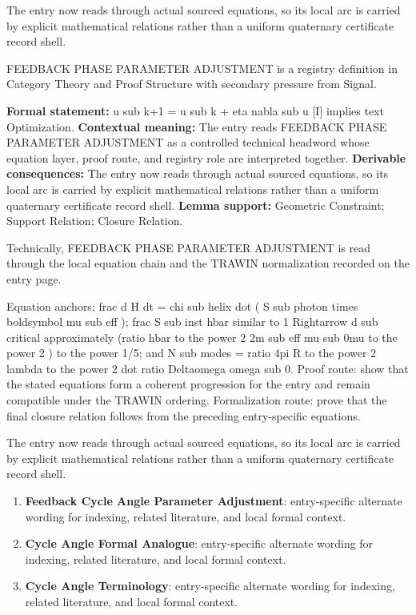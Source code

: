 The entry now reads through actual sourced equations, so its local arc is carried by explicit mathematical relations rather than a uniform quaternary certificate record shell.
\clearpage


\begingroup\small
{}
FEEDBACK PHASE PARAMETER ADJUSTMENT is a registry definition in Category Theory and Proof Structure with secondary pressure from Signal.

\begingroup\footnotesize\setlength{\emergencystretch}{3em}\sloppy
\textbf{Formal statement:} u sub k+1 = u sub k + eta nabla sub u [I] implies text Optimization. \textbf{Contextual meaning:} The entry reads FEEDBACK PHASE PARAMETER ADJUSTMENT as a controlled technical headword whose equation layer, proof route, and registry role are interpreted together. \textbf{Derivable consequences:} The entry now reads through actual sourced equations, so its local arc is carried by explicit mathematical relations rather than a uniform quaternary certificate record shell. \textbf{Lemma support:} Geometric Constraint; Support Relation; Closure Relation.\par
\endgroup

Technically, FEEDBACK PHASE PARAMETER ADJUSTMENT is read through the local equation chain and the TRAWIN normalization recorded on the entry page.

Equation anchors: frac d H dt = chi sub helix dot ( S sub photon times boldsymbol mu sub eff ); frac S sub inst hbar similar to 1 Rightarrow d sub critical approximately (ratio hbar to the power 2 2m sub eff mu sub 0mu to the power 2 ) to the power 1/5; and N sub modes = ratio 4pi R to the power 2 lambda to the power 2 dot ratio Deltaomega omega sub 0. Proof route: show that the stated equations form a coherent progression for the entry and remain compatible under the TRAWIN ordering. Formalization route: prove that the final closure relation follows from the preceding entry-specific equations.

The entry now reads through actual sourced equations, so its local arc is carried by explicit mathematical relations rather than a uniform quaternary certificate record shell.
\endgroup

\begin{enumerate}[leftmargin=1.6em,itemsep=6pt,topsep=4pt]
\item \textbf{Feedback Cycle Angle Parameter Adjustment}: entry-specific alternate wording for indexing, related literature, and local formal context.
\item \textbf{Cycle Angle Formal Analogue}: entry-specific alternate wording for indexing, related literature, and local formal context.
\item \textbf{Cycle Angle Terminology}: entry-specific alternate wording for indexing, related literature, and local formal context.
\end{enumerate}

